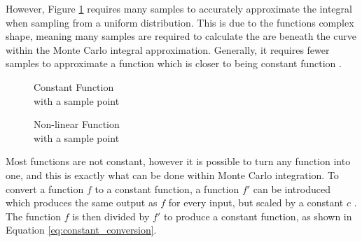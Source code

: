 \documentclass[ %
                    author={Callum Pearce},
                supervisor={Dr. Neill Campbell},
                    degree={MEng},
                     title={How effective are Temporal difference learning methods for reducing the number of zero contribution light paths while still accurately approximating Global Illumination in Path tracing?},
                  subtitle={},
                      type={research},
                      year={2019} ]{dissertation}
\begin{document}
However, Figure \ref{fig:non_lin_function} requires many samples to accurately approximate the integral when sampling from a uniform distribution. This is due to the functions complex shape, meaning many samples are required to calculate the are beneath the curve within the Monte Carlo integral approximation. Generally, it requires fewer samples to approximate a function which is closer to being constant function \cite{morokoff1995quasi}.

\begin{figure}[h]
\captionsetup{justification=centering}
\centering
\begin{minipage}{.33\textwidth}
    \hspace*{\fill}%
     \caption{Constant Function\\ with a sample point}
  \label{fig:constant_function}
\end{minipage}
\hspace{8em}
\begin{minipage}{.33\textwidth}
    
  \hspace*{\fill}%

  \caption{ Non-linear Function\\ with a sample point}
  \label{fig:non_lin_function}
\end{minipage}
\end{figure}

Most functions are not constant, however it is possible to turn any function into one, and this is exactly what can be done within Monte Carlo integration. To convert a function $f$ to a constant function, a function $f'$ can be introduced which produces the same output as $f$ for every input, but scaled by a constant $c$ \cite{scratchapixel_2015}. The function $f$ is then divided by $f'$ to produce a constant function, as shown in Equation \ref{eq:constant_conversion}.
\end{document}
